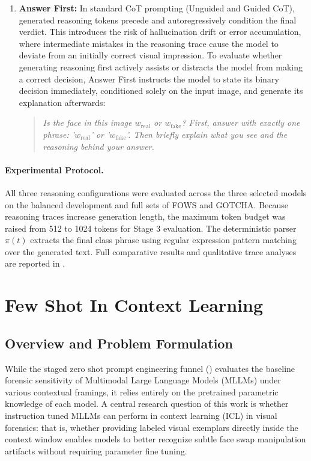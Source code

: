 \begin{enumerate}
    \item \textbf{Answer First:} In standard CoT prompting (Unguided and Guided CoT), generated reasoning tokens precede and autoregressively condition the final verdict. This introduces the risk of hallucination drift or error accumulation, where intermediate mistakes in the reasoning trace cause the model to deviate from an initially correct visual impression. To evaluate whether generating reasoning first actively assists or distracts the model from making a correct decision, Answer First instructs the model to state its binary decision immediately, conditioned solely on the input image, and generate its explanation afterwards:
    \begin{quote}
        \emph{Is the face in this image $w_{\text{real}}$ or $w_{\text{fake}}$? First, answer with exactly one phrase: '$w_{\text{real}}$' or '$w_{\text{fake}}$'. Then briefly explain what you see and the reasoning behind your answer.}
    \end{quote}
\end{enumerate}

\paragraph{Experimental Protocol.}
All three reasoning configurations were evaluated across the three selected models on the balanced development and full sets of FOWS and GOTCHA. Because reasoning traces increase generation length, the maximum token budget was raised from \num{512} to \num{1024} tokens for Stage 3 evaluation. The deterministic parser $\pi(t)$ extracts the final class phrase using regular expression pattern matching over the generated text. Full comparative results and qualitative trace analyses are reported in .

\section{Few Shot In Context Learning}
\label{sec:few_shot_method}

\subsection{Overview and Problem Formulation}
\label{subsec:fewshot_overview}

While the staged zero shot prompt engineering funnel () evaluates the baseline forensic sensitivity of Multimodal Large Language Models (MLLMs) under various contextual framings, it relies entirely on the pretrained parametric knowledge of each model. A central research question of this work is whether instruction tuned MLLMs can perform in context learning (ICL) in visual forensics: that is, whether providing labeled visual exemplars directly inside the context window enables models to better recognize subtle face swap manipulation artifacts without requiring parameter fine tuning.

